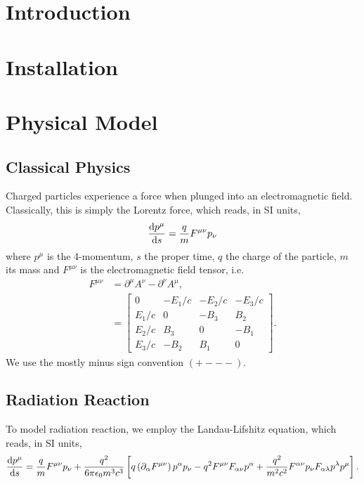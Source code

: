\documentclass[10pt,letterpaper,extrafontsizes, onecolumn,openright]{memoir}
\begin{document}
\chapter{Introduction}

\chapter{Installation}

\chapter{Physical Model}

\section{Classical Physics}

Charged particles experience a force when plunged into an electromagnetic field.
Classically, this is simply the Lorentz force, which reads, in SI units,
  \begin{equation}
    \dv{p^\mu}{s} = \frac{q}{m}F^{\mu\nu}p_\nu
  \end{equation}
where $p^\mu$ is the 4-momentum, $s$ the proper time, $q$ the charge of the
particle, $m$ its mass and $F^{\mu\nu}$ is the electromagnetic field tensor, i.e.
  \begin{align}
    F^{\mu\nu} &= \partial^\mu A^\nu - \partial^\nu A^\mu, \\
               &= \begin{bmatrix}
                    0      & -E_1/c     & -E_2/c     & -E_3/c \\
                    E_1/c  & 0          & -B_3       & B_2     \\
                    E_2/c  & B_3        & 0          & -B_1    \\
                    E_3/c  & -B_2       & B_1        & 0
                  \end{bmatrix}.
  \end{align}
We use the mostly minus sign convention $(+---)$.

\section{Radiation Reaction}

To model radiation reaction, we employ the Landau-Lifshitz equation, which
reads, in SI units,
  \begin{equation}
    \dv{p^\mu}{s} = \frac{q}{m}F^{\mu\nu}p_\nu
                   +\frac{q^2}{6\pi\epsilon_0m^3c^3}
                      \left[
                        q\left(\partial_\alpha F^{\mu\nu}\right)p^\alpha p_\nu
                      - q^2 F^{\mu\nu}F_{\alpha\nu}p^\alpha
                      + \frac{q^2}{m^2c^2} F^{\alpha\nu}p_\nu F_{\alpha\lambda}p^\lambda p^\mu
                      \right].
  \end{equation}
\end{document}
